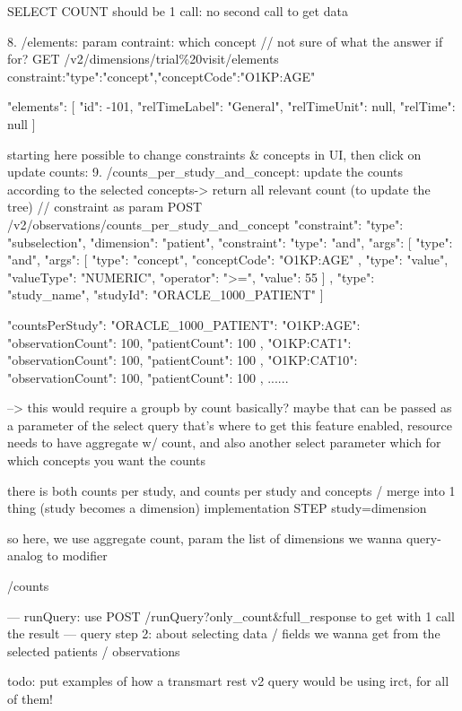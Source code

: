 SELECT COUNT should be 1 call: no second call to get data


8. /elements: param contraint: which concept // not sure of what the answer if for?
GET /v2/dimensions/trial\%20visit/elements
constraint:{"type":"concept","conceptCode":"O1KP:AGE"}

{
  "elements": 
  [
    {
      "id": -101,
      "relTimeLabel": "General",
      "relTimeUnit": null,
      "relTime": null
    }
  ]
}


starting here possible to change constraints & concepts in UI, then click on update counts:
9. /counts\_per\_study\_and\_concept: update the counts according to the selected concepts-> return all relevant count (to update the tree) // constraint as param
POST /v2/observations/counts\_per\_study\_and\_concept
{
  "constraint": {
    "type": "subselection",
    "dimension": "patient",
    "constraint": {
      "type": "and",
      "args": [
        {
          "type": "and",
          "args": [
            {
              "type": "concept",
              "conceptCode": "O1KP:AGE"
            },
            {
              "type": "value",
              "valueType": "NUMERIC",
              "operator": ">=",
              "value": 55
            }
          ]
        },
        {
          "type": "study_name",
          "studyId": "ORACLE_1000_PATIENT"
        }
      ]
    }
  }
}

{
  "countsPerStudy": {
    "ORACLE_1000_PATIENT": {
      "O1KP:AGE": {
        "observationCount": 100,
        "patientCount": 100
      },
      "O1KP:CAT1": {
        "observationCount": 100,
        "patientCount": 100
      },
      "O1KP:CAT10": {
        "observationCount": 100,
        "patientCount": 100
      },
      ......
    }
  }
}

--> this would require a groupb by count basically? maybe that can be passed as a parameter of the select query
that's where to get this feature enabled, resource needs to have aggregate w/ count, and also another select parameter which for which concepts you want the counts

there is both counts per study, and counts per study and concepts / merge into 1 thing (study becomes a dimension)
implementation STEP study=dimension

so here, we use aggregate count, param the list of dimensions we wanna query-analog to modifier

/counts



---
runQuery: use POST /runQuery?only\_count\&full\_response to get with 1 call the result
--- query step 2: about selecting data  / fields we wanna get from the selected patients / observations 


todo: put examples of how a transmart rest v2 query would be using irct, for all of them!



